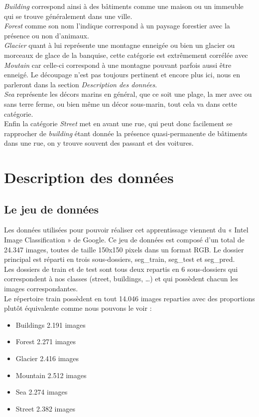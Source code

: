 \documentclass[12pt ,a4paper ]{article}
\begin{document}
\begin{multicols}{2}
\bigskip
\textit{Building} correspond ainsi à des bâtiments comme une maison ou un immeuble qui se trouve généralement dans une ville. \\
\textit{Forest} comme son nom l'indique correspond à un paysage forestier avec la présence ou non d'animaux. \\
\textit{Glacier} quant à lui représente une montagne enneigée ou bien un glacier ou morceaux de glace de la banquise, cette catégorie est extrêmement corrélée avec \textit{Moutain} car celle-ci correspond à une montagne pouvant parfois aussi être enneigé. Le découpage n'est pas toujours pertinent et encore plus ici, nous en parleront dans la section \textit{Description des données}.\\
 \textit{Sea} représente les décors marins en général, que ce soit une plage, la mer avec ou sans terre ferme, ou bien même un décor sous-marin, tout cela va dans cette catégorie. \\
Enfin la catégorie \textit{Street} met en avant une rue, qui peut donc facilement se rapprocher de \textit{building} étant donnée la présence quasi-permanente de bâtiments dans une rue, on y trouve souvent des passant et des voitures.  

\newpage
\section{Description des données}

\subsection{Le jeu de données}

	Les données utilisées pour pouvoir réaliser cet apprentissage viennent du « Intel Image Classification » de Google. Ce jeu de données est composé d’un total de 24.347 images, toutes de taille 150x150 pixels dans un format RGB. Le dossier principal est réparti en trois sous-dossiers, seg\_train, seg\_test et seg\_pred. \\
Les dossiers de train et de test sont tous deux repartis en 6 sous-dossiers qui correspondent à nos classes (street, buildings, …) et qui possèdent chacun les images correspondantes.\\
Le répertoire train possèdent en tout 14.046 images reparties avec des proportions plutôt équivalente comme nous pouvons le voir :

\bigskip
\begin{itemize}
\item Buildings 2.191 images
\item Forest 2.271 images
\item Glacier 2.416 images
\item Mountain 2.512 images
\item Sea 2.274 images
\item Street 2.382 images
\end{itemize}
\bigskip


\end{multicols}
\end{document}
